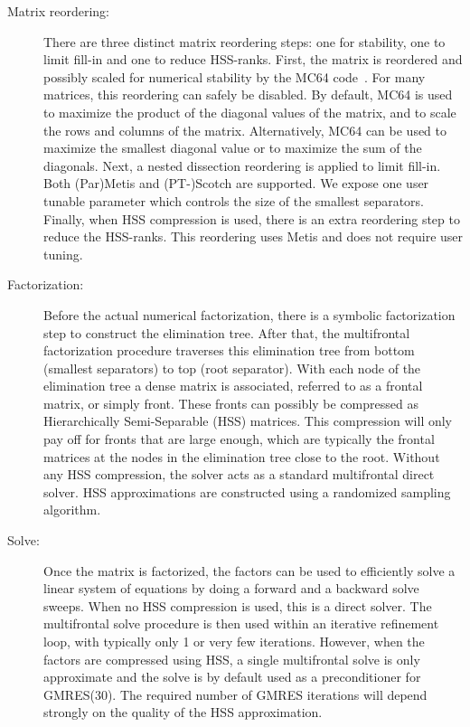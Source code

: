 \documentclass{article}
\begin{document}
\begin{description}
\item[Matrix reordering:] There are three distinct matrix reordering
  steps: one for stability, one to limit fill-in and one to reduce
  HSS-ranks. First, the matrix is reordered and possibly scaled for
  numerical stability by the MC64 code~\cite{duff1999design}. For many
  matrices, this reordering can safely be disabled. By default, MC64
  is used to maximize the product of the diagonal values of the
  matrix, and to scale the rows and columns of the
  matrix. Alternatively, MC64 can be used to maximize the smallest
  diagonal value or to maximize the sum of the diagonals. Next, a
  nested dissection reordering is applied to limit fill-in.  Both
  (Par)Metis and (PT-)Scotch are supported. We expose one user tunable
  parameter which controls the size of the smallest
  separators. Finally, when HSS compression is used, there is an extra
  reordering step to reduce the HSS-ranks. This reordering uses Metis
  and does not require user tuning.

\item[Factorization:] Before the actual numerical factorization, there
  is a symbolic factorization step to construct the elimination
  tree. After that, the multifrontal factorization procedure traverses
  this elimination tree from bottom (smallest separators) to top (root
  separator). With each node of the elimination tree a dense matrix is
  associated, referred to as a frontal matrix, or simply front. These
  fronts can possibly be compressed as Hierarchically Semi-Separable
  (HSS) matrices. This compression will only pay off for fronts that
  are large enough, which are typically the frontal matrices at the
  nodes in the elimination tree close to the root. Without any HSS
  compression, the solver acts as a standard multifrontal direct
  solver. HSS approximations are constructed using a randomized
  sampling algorithm.

\item[Solve:] Once the matrix is factorized, the factors can be used
  to efficiently solve a linear system of equations by doing a forward
  and a backward solve sweeps. When no HSS compression is used, this
  is a direct solver. The multifrontal solve procedure is then used
  within an iterative refinement loop, with typically only 1 or very
  few iterations. However, when the factors are compressed using HSS,
  a single multifrontal solve is only approximate and the solve is by
  default used as a preconditioner for GMRES($30$). The required
  number of GMRES iterations will depend strongly on the quality of
  the HSS approximation.
\end{description}
\end{document}
